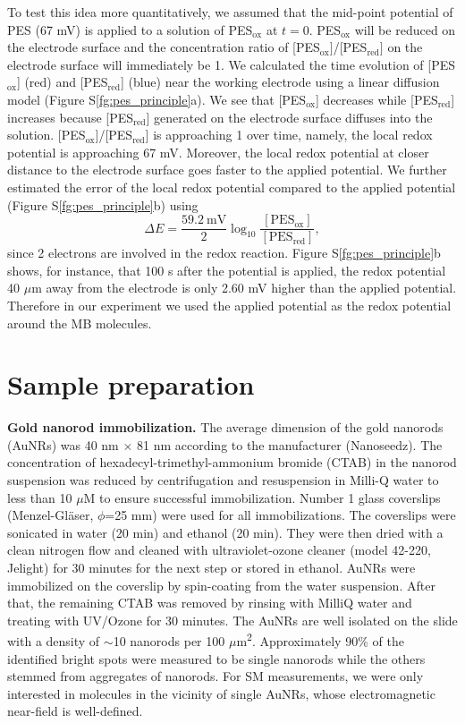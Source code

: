 \documentclass[11pt,a4paper,onecolumn]{article}
\begin{document}
To test this idea more quantitatively, we assumed that the mid-point potential of PES (67 mV) is applied to a solution of PES$_\mathrm{ox}$ at $t=0$. PES$_\mathrm{ox}$ will be reduced on the electrode surface and the concentration ratio of [PES$_\mathrm{ox}]$/[PES$_\mathrm{red}]$ on the electrode surface will immediately be 1. We calculated the time evolution of [PES$_\mathrm{ox}$] (red) and [PES$_\mathrm{red}$] (blue) near the working electrode using a linear diffusion model \cite{bard2000ecbook} (Figure S\ref{fg:pes_principle}a). We see that [PES$_\mathrm{ox}$] decreases while [PES$_\mathrm{red}$] increases because [PES$_\mathrm{red}$] generated on the electrode surface diffuses into the solution. [PES$_\mathrm{ox}]$/[PES$_\mathrm{red}]$ is approaching 1 over time, namely, the local redox potential is approaching 67 mV. Moreover, the local redox potential at closer distance to the electrode surface goes faster to the applied potential. We further estimated the error of the local redox potential compared to the applied potential (Figure S\ref{fg:pes_principle}b) using
\begin{equation}
\Delta E = \frac{59.2\ \mathrm{mV}}{2}\log_{10}\frac{\mathrm{[PES_{ox}]}}{\mathrm{[PES_{red}]}},
\label{eq:pes_potential_error}
\end{equation}
since 2 electrons are involved in the redox reaction.
Figure S\ref{fg:pes_principle}b shows, for instance, that 100 s after the potential is applied, the redox potential 40 $\mu$m away from the electrode is only 2.60 mV higher than the applied potential. Therefore in our experiment we used the applied potential as the redox potential around the MB molecules.


\section{Sample preparation}

\textbf{Gold nanorod immobilization.} The average dimension of the gold nanorods (AuNRs) was 40 nm \(\times\) 81 nm according to the manufacturer (Nanoseedz). The concentration of hexadecyl-trimethyl-ammonium bromide (CTAB) in the nanorod suspension was reduced by centrifugation and resuspension in Milli-Q water to less than 10 $\mu$M to ensure successful immobilization. Number 1 glass coverslips (Menzel-Gl{\"a}ser, \(\phi\)=25 mm) were used for all immobilizations. The coverslips were sonicated in water (20 min) and ethanol (20 min). They were then dried with a clean nitrogen flow and cleaned with ultraviolet-ozone cleaner (model 42-220, Jelight) for 30 minutes for the next step or stored in ethanol. AuNRs were immobilized on the coverslip by spin-coating from the water suspension. After that, the remaining CTAB was removed by rinsing with MilliQ water and treating with UV/Ozone for 30 minutes. The AuNRs are well isolated on the slide with a density of \(\sim\)10 nanorods per 100 \(\mu\)m\textsuperscript{2}. Approximately 90\% of the identified bright spots were measured to be single nanorods while the others stemmed from aggregates of nanorods. For SM measurements, we were only interested in molecules in the vicinity of single AuNRs, whose electromagnetic near-field is well-defined.
\end{document}
